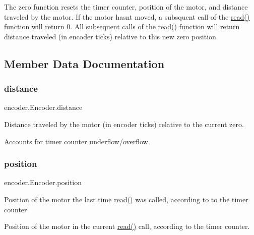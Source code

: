 The zero function resets the timer counter, position of the motor, and distance traveled by the motor. If the motor hasn\textquotesingle{}t moved, a subsquent call of the \mbox{\hyperlink{classencoder_1_1_encoder_aa1c1535160682500f5214f45d8197027}{read()}} function will return 0. All subsequent calls of the \mbox{\hyperlink{classencoder_1_1_encoder_aa1c1535160682500f5214f45d8197027}{read()}} function will return distance traveled (in encoder ticks) relative to this new zero position. 

\subsection{Member Data Documentation}
\mbox{\label{classencoder_1_1_encoder_ac16be7b70ef28d19b75108d422f82e28}} 
\subsubsection{\texorpdfstring{distance}{distance}}
{\footnotesize\ttfamily encoder.\+Encoder.\+distance}



Distance traveled by the motor (in encoder ticks) relative to the current zero. 

Accounts for timer counter underflow/overflow. \mbox{\label{classencoder_1_1_encoder_a9c15eb087b5869c188cf94e53ea3b4f5}} 
\subsubsection{\texorpdfstring{position}{position}}
{\footnotesize\ttfamily encoder.\+Encoder.\+position}



Position of the motor the last time \mbox{\hyperlink{classencoder_1_1_encoder_aa1c1535160682500f5214f45d8197027}{read()}} was called, according to to the timer counter. 

Position of the motor in the current \mbox{\hyperlink{classencoder_1_1_encoder_aa1c1535160682500f5214f45d8197027}{read()}} call, according to the timer counter.\mbox{\label{classencoder_1_1_encoder_a8e9c3e1317abc4f6fbe95468c69223d1}} 
